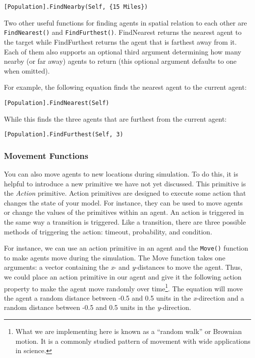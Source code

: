 \documentclass[]{memoir}
\begin{document}
\lstinline![Population].FindNearby(Self, {15 Miles})!

Two other useful functions for finding agents in spatial relation to
each other are \lstinline!FindNearest()! and \lstinline!FindFurthest()!.
FindNearest returns the nearest agent to the target while FindFurthest
returns the agent that is farthest away from it. Each of them also
supports an optional third argument determining how many nearby (or far
away) agents to return (this optional argument defaults to one when
omitted).

For example, the following equation finds the nearest agent to the
current agent:

\lstinline![Population].FindNearest(Self)!

While this finds the three agents that are furthest from the current
agent:

\lstinline![Population].FindFurthest(Self, 3)!

\subsubsection{Movement Functions}

You can also move agents to new locations during simulation. To do this,
it is helpful to introduce a new primitive we have not yet discussed.
This primitive is the \emph{Action} primitive. Action primitives are
designed to execute some action that changes the state of your model.
For instance, they can be used to move agents or change the values of
the primitives within an agent. An action is triggered in the same way a
transition is triggered. Like a transition, there are three possible
methods of triggering the action: timeout, probability, and condition.

For instance, we can use an action primitive in an agent and the
\lstinline!Move()! function to make agents move during the simulation.
The Move function takes one arguments: a vector containing the \emph{x}-
and \emph{y}-distances to move the agent. Thus, we could place an action
primitive in our agent and give it the following action property to make
the agent move randomly over time\footnote{What we are implementing here
  is known as a ``random walk'' or Brownian motion. It is a commonly
  studied pattern of movement with wide applications in science.}. The
equation will move the agent a random distance between -0.5 and 0.5
units in the \emph{x}-direction and a random distance between -0.5 and
0.5 units in the \emph{y}-direction.
\end{document}
